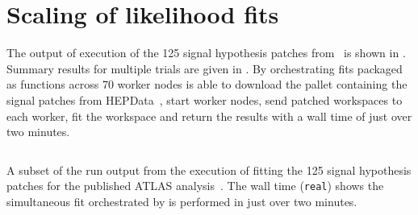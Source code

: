\section{Scaling of likelihood fits}\label{sec:results}
%
The output of execution of the 125 signal hypothesis patches from~\cite{SUSY-2019-08} is shown in .
Summary results for multiple trials are given in .
By orchestrating \pyhf{} fits packaged as \funcX{} functions across 70 worker nodes \funcX{} is able to download the \pyhf{} pallet containing the signal patches from HEPData~\cite{ATLAS_SUSY_1Lbb_pallet}, start \funcX{} worker nodes, send patched workspaces to each worker, fit the workspace and return the results with a wall time of just over two minutes.
\\

\begin{listing}
 \inputminted{text}{src/code/funcX_demo_output.txt}
 \caption{A subset of the run output from the execution of fitting the 125 signal hypothesis patches for the published ATLAS analysis~\cite{SUSY-2019-08}.
 The wall time (\texttt{real}) shows the simultaneous fit orchestrated by \funcX{} is performed in just over two minutes.}
 \label{lst:funcX_demo_output}
\end{listing}



